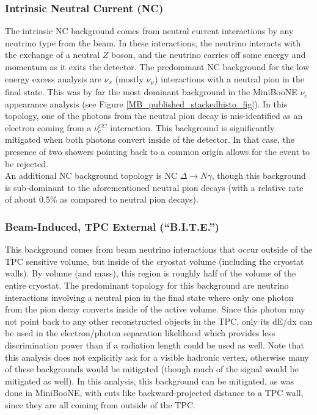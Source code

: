 \subsubsection{Intrinsic Neutral Current (NC)}
The intrinsic NC background comes from neutral current interactions by any neutrino type from the beam. In these interactions, the neutrino interacts with the exchange of a neutral $Z$ boson, and the neutrino carries off some energy and momentum as it exits the detector. The predominant NC background for the low energy excess analysis are $\nu_x$ (mostly $\nu_\mu$) interactions with a neutral pion in the final state. This was by far the most dominant background in the MiniBooNE $\nu_e$ appearance analysis (see Figure \ref{MB_published_stackedhisto_fig}). In this topology, one of the photons from the neutral pion decay is mis-identified as an electron coming from a $\nu_e^{CC}$ interaction. This background is significantly mitigated when both photons convert inside of the detector. In that case, the presence of two showers pointing back to a common origin allows for the event to be rejected.\\

An additional NC background topology is NC $\Delta \rightarrow N\gamma$, though this background is sub-dominant to the aforementioned neutral pion decays (with a relative rate of about 0.5\% as compared to neutral pion decays).

\subsubsection{Beam-Induced, TPC External (``B.I.T.E.'')}\label{BITE_physics_section}
This background comes from beam neutrino interactions that occur outside of the TPC sensitive volume, but inside of the cryostat volume (including the cryostat walls). By volume (and mass), this region is roughly half of the volume of the entire cryostat. The predominant topology for this background are neutrino interactions involving a neutral pion in the final state where only one photon from the pion decay converts inside of the active volume. Since this photon may not point back to any other reconstructed objects in the TPC, only its dE/dx can be used in the electron/photon separation likelihood which provides less discrimination power than if a radiation length could be used as well. Note that this analysis does not explicitly ask for a visible hadronic vertex, otherwise many of these backgrounds would be mitigated (though much of the signal would be mitigated as well). In this analysis, this background can be mitigated, as was done in MiniBooNE, with cuts like backward-projected distance to a TPC wall, since they are all coming from outside of the TPC.

